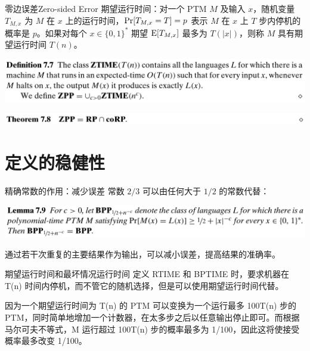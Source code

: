\documentclass[UTF8,aspectratio=169,mathserif]{beamer}
\begin{document}
	\begin{frame}{零边误差}{Zero-sided Error}
		期望运行时间：对一个 PTM $M$ 及输入 $x$，随机变量 $T_{M,x}$ 为 $M$ 在 $x$ 上的运行时间，${\rm Pr}[T_{M,x}=T]=p$ 表示 $M$ 在 $x$ 上 $T$ 步内停机的概率是 $p$。如果对每个 $x\in\{0,1\}^*$ 期望 ${\rm E}[T_{M,x}]$ 最多为 $T(|x|)$，则称 $M$ 具有期望运行时间 $T(n)$。\newline
		
		\includegraphics[width=\linewidth]{../../7/note.assets/image-20210509153030302.png}\newline
		
		\includegraphics[width=\linewidth]{../../7/note.assets/image-20210509153059395.png}
	\end{frame}
	
	\section{定义的稳健性}
	\begin{frame}{精确常数的作用：减少误差}
		常数 $2/3$ 可以由任何大于 $1/2$ 的常数代替：\newline
		
		\includegraphics[width=\linewidth]{../../7/note.assets/image-20210509153425924.png}\newline
		
		通过若干次重复的主要结果作为输出，可以减小误差，提高结果的准确率。
	\end{frame}

	\begin{frame}{期望运行时间和最坏情况运行时间}
		定义 RTIME 和 BPTIME 时，要求机器在 T(n) 时间内停机，而不管它的随机选择，但是可以使用期望运行时间代替。\newline
		
		因为一个期望运行时间为 T(n) 的 PTM 可以变换为一个运行最多 100T(n) 步的 PTM，同时简单地增加一个计数器，在太多步之后以任意输出停止即可。而根据马尔可夫不等式，M 运行超过 100T(n) 步的概率最多为 1/100，因此这将使接受概率最多改变 1/100。
	\end{frame}
\end{document}
